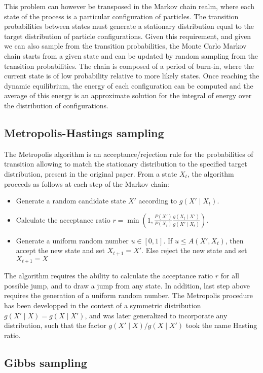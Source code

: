 This problem can however be transposed in the Markov chain realm, where each state of the process is a particular configuration of particles.
The transition probabilities between states must generate a stationary distribution equal to the target distribution of particle configurations.
Given this requirement, and given we can also sample from the transition probabilities, the Monte Carlo Markov chain starts from a given state and can be updated by random sampling from the transition probabilities.
The chain is composed of a period of burn-in, where the current state is of low probability relative to more likely states.
Once reaching the dynamic equilibrium, the energy of each configuration can be computed and the average of this energy is an approximate solution for the integral of energy over the distribution of configurations.


\subsection{Metropolis-Hastings sampling}

The Metropolis algorithm is an acceptance/rejection rule for the probabilities of transition allowing to match the stationary distribution to the specified target distribution, present in the original paper.
From a state $X_t$, the algorithm proceeds as follows at each step of the Markov chain:
\begin{itemize}
	\item Generate a random candidate state $X'$ according to $g(X'\mid X_t)$.
	\item Calculate the acceptance ratio $\displaystyle r=\min \left(1,{\frac {P(X')}{P(X_{t})}}{\frac {g(X_{t}\mid X')}{g(X'\mid X_{t})}}\right)$.
	\item Generate a uniform random number $u\in [0,1]$.
	If $u\leq A(X',X_{t})$, then accept the new state and set $X_{t+1}=X'$.
	Else reject the new state and set $X_{t+1}=X$
\end{itemize}

The algorithm requires the ability to calculate the acceptance ratio $r$ for all possible jump, and to draw a jump from any state. 
In addition, last step above requires the generation of a uniform random number.
The Metropolis procedure has been developped in the context of a symmetric distribution $g(X'\mid X) = g(X \mid X')$, and was later generalized to incorporate any distribution, such that the factor $g(X'\mid X) / g(X \mid X')$ took the name Hasting ratio.

\subsection{Gibbs sampling}

